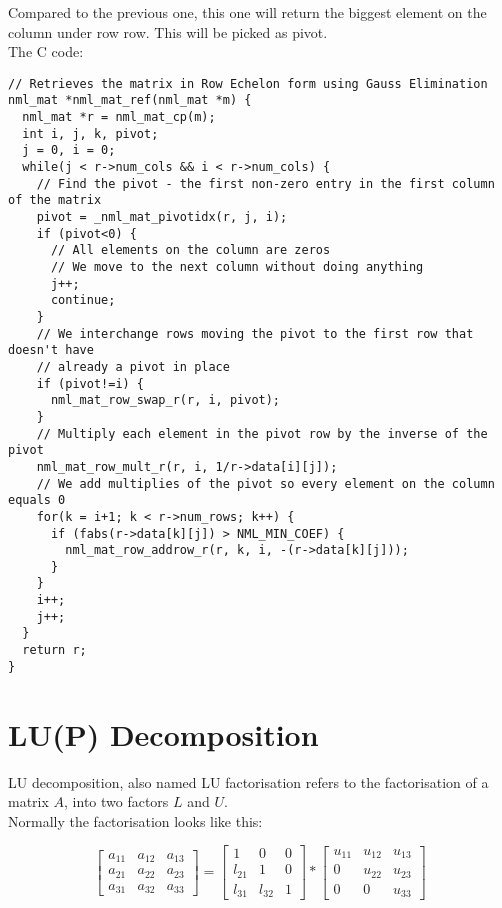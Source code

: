Compared to the previous one, this one will return the biggest element on the column under row row. This will be picked as pivot.
\\

The C code:

\begin{verbatim}
// Retrieves the matrix in Row Echelon form using Gauss Elimination
nml_mat *nml_mat_ref(nml_mat *m) {
  nml_mat *r = nml_mat_cp(m);
  int i, j, k, pivot;
  j = 0, i = 0;
  while(j < r->num_cols && i < r->num_cols) {
    // Find the pivot - the first non-zero entry in the first column of the matrix
    pivot = _nml_mat_pivotidx(r, j, i);
    if (pivot<0) {
      // All elements on the column are zeros
      // We move to the next column without doing anything
      j++;
      continue;
    }
    // We interchange rows moving the pivot to the first row that doesn't have
    // already a pivot in place
    if (pivot!=i) {
      nml_mat_row_swap_r(r, i, pivot);
    }
    // Multiply each element in the pivot row by the inverse of the pivot
    nml_mat_row_mult_r(r, i, 1/r->data[i][j]);
    // We add multiplies of the pivot so every element on the column equals 0
    for(k = i+1; k < r->num_rows; k++) {
      if (fabs(r->data[k][j]) > NML_MIN_COEF) {
        nml_mat_row_addrow_r(r, k, i, -(r->data[k][j]));
      } 
    }
    i++;
    j++;
  }
  return r;
} 
\end{verbatim}

\section{LU(P) Decomposition}

LU decomposition, also named LU factorisation refers to the factorisation of a matrix $A$, into two factors $L$ and $U$.
\\

Normally the factorisation looks like this:

$$
\begin{bmatrix}
a_{11} & a_{12} & a_{13} \\
a_{21} & a_{22} & a_{23} \\
a_{31} & a_{32} & a_{33} 
\end{bmatrix}
=
\begin{bmatrix}
1 & 0 & 0 \\
l_{21} & 1 & 0 \\
l_{31} & l_{32} & 1
\end{bmatrix} 
* 
\begin{bmatrix}
u_{11} & u_{12} & u_{13} \\
0 & u_{22} & u_{23} \\
0 & 0 & u_{33}
\end{bmatrix}
$$

